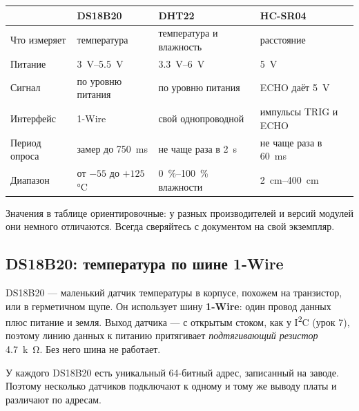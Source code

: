 \begin{center}\small
\begin{tabularx}{\textwidth}{@{}l X X X@{}}
\toprule
 & DS18B20 & DHT22 & HC-SR04 \\
\midrule
Что измеряет & температура & температура и влажность & расстояние \\
Питание & \SIrange{3}{5.5}{V} & \SIrange{3.3}{6}{V} & \SI{5}{V} \\
Сигнал & по уровню питания & по уровню питания & ECHO даёт \SI{5}{V} \\
Интерфейс & 1-Wire & свой однопроводной & импульсы TRIG и ECHO \\
Период опроса & замер до \SI{750}{ms} & не чаще раза в \SI{2}{s} & не чаще раза в \SI{60}{ms} \\
Диапазон & от $-55$ до $+125$\,°C & \SIrange{0}{100}{\percent} влажности & \SIrange{2}{400}{cm} \\
\bottomrule
\end{tabularx}
\end{center}

Значения в таблице ориентировочные: у разных производителей и версий модулей они немного отличаются.
Всегда сверяйтесь с документом на свой экземпляр.

\subsection{DS18B20: температура по шине 1-Wire}

DS18B20 --- маленький датчик температуры в корпусе, похожем на транзистор, или в герметичном щупе. Он
использует шину \textbf{1-Wire}: один провод данных плюс питание и земля. Выход датчика
--- с открытым стоком, как у I\textsuperscript{2}C (урок 7), поэтому линию данных к питанию притягивает
\emph{подтягивающий резистор} \SI{4.7}{k\ohm}. Без него шина не работает.

У каждого DS18B20 есть уникальный 64-битный адрес, записанный на заводе. Поэтому несколько датчиков
подключают к одному и тому же выводу платы и различают по адресам.

